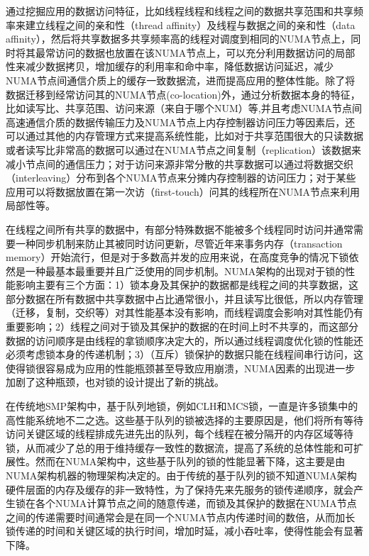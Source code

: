 通过挖掘应用的数据访问特征，比如线程线程和线程之间的数据共享范围和共享频率来建立线程之间的亲和性（thread affinity）及线程与数据之间的亲和性（data affinity）\cite{diener2014kmaf}\cite{azimi2009enhancing}\cite{tikir2008hardware}，然后将共享数据多共享频率高的线程对调度到相同的NUMA节点上，同时将其最常访问的数据也放置在该NUMA节点上，可以充分利用数据访问的局部性来减少数据拷贝，增加缓存的利用率和命中率，降低数据访问延迟，减少NUMA节点间通信介质上的缓存一致数据流，进而提高应用的整体性能\cite{chishti2005optimizing}。除了将数据迁移到经常访问其的NUMA节点(co-location)外，通过分析数据本身的特征，比如读写比、共享范围、访问来源（来自于哪个NUM）等,并且考虑NUMA节点间高速通信介质的数据传输压力及NUMA节点上内存控制器访问压力等因素后，还可以通过其他的内存管理方式来提高系统性能\cite{dashti2013traffic}\cite{molka2011memory}，比如对于共享范围很大的只读数据或者读写比非常高的数据可以通过在NUMA节点之间复制（replication）该数据来减小节点间的通信压力；对于访问来源非常分散的共享数据可以通过将数据交织（interleaving）分布到各个NUMA节点来分摊内存控制器的访问压力；对于某些应用可以将数据放置在第一次访（first-touch）问其的线程所在NUMA节点来利用局部性等。

在线程之间所有共享的数据中，有部分特殊数据不能被多个线程同时访问并通常需要一种同步机制来防止其被同时访问更新，尽管近年来事务内存（transaction memory）开始流行，但是对于多数高并发的应用来说，在高度竞争的情况下锁依然是一种最基本最重要并且广泛使用的同步机制\cite{tallent2010analyzing}\cite{johnson2010decoupling}。NUMA架构的出现对于锁的性能影响主要有三个方面：1）锁本身及其保护的数据都是线程之间的共享数据，这部分数据在所有数据中共享数据中占比通常很小，并且读写比很低，所以内存管理（迁移，复制，交织等）对其性能基本没有影响，而线程调度会影响对其性能仍有重要影响；2）线程之间对于锁及其保护的数据的在时间上时不共享的，而这部分数据的访问顺序是由线程的拿锁顺序决定大的，所以通过线程调度优化锁的性能还必须考虑锁本身的传递机制；3）（互斥）锁保护的数据只能在线程间串行访问，这使得锁很容易成为应用的性能瓶颈甚至导致应用崩溃，NUMA因素的出现进一步加剧了这种瓶颈，也对锁的设计提出了新的挑战。

在传统地SMP架构中，基于队列地锁，例如CLH\cite{craig1993building}\cite{magnusson1994queue}\cite{scott2013shared}和MCS锁\cite{mellor1991algorithms}\cite{scott2013shared}，一直是许多锁集中的高性能系统地不二之选。这些基于队列的锁被选择的主要原因是，他们将所有等待访问关键区域的线程排成先进先出的队列，每个线程在被分隔开的内存区域等待锁，从而减少了总的用于维持缓存一致性的数据流，提高了系统的总体性能和可扩展性。然而在NUMA架构中，这些基于队列的锁的性能显著下降，这主要是由NUMA架构机器的物理架构决定的。由于传统的基于队列的锁不知道NUMA架构硬件层面的内存及缓存的非一致特性，为了保持先来先服务的锁传递顺序，就会产生锁在各个NUMA计算节点之间的随意传递，而锁及其保护的数据在NUMA节点之间的传递需要时间通常会是在同一个NUMA节点内传递时间的数倍，从而加长锁传递的时间和关键区域的执行时间，增加时延，减小吞吐率，使得性能会有显著下降。

